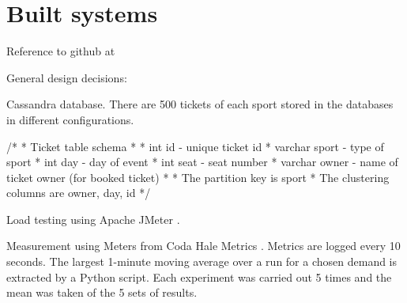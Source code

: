%
%

\section{Built systems}
\begin{shaded}

Reference to github at \cite{RN1073}

General design decisions:

Cassandra \cite{RN1050}\cite{RN1075} database.  There are 500 tickets of each sport stored in the databases in different configurations.

/*
* Ticket table schema
* 
* int id - unique ticket id
* varchar sport - type of sport
* int day - day of event
* int seat - seat number
* varchar owner - name of ticket owner (for booked ticket)
* 
* The partition key is sport
* The clustering columns are owner, day, id
*/

Load testing using Apache JMeter \cite{RN1074}.

Measurement using Meters from Coda Hale Metrics \cite{RN1079}.  Metrics are logged every 10 seconds. The largest 1-minute moving average over a run for a chosen demand is extracted by a Python script.  Each experiment was carried out 5 times and the mean was taken of the 5 sets of results.

\end{shaded}

%
%
